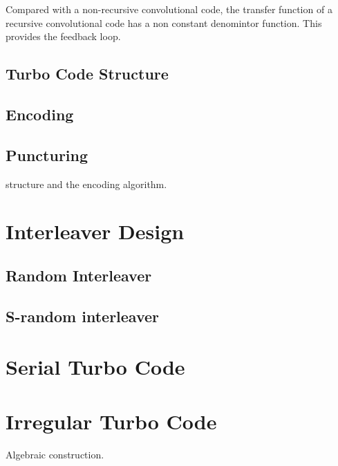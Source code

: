 Compared with a non-recursive convolutional code, the transfer function of a recursive convolutional code has a non constant denomintor function. This provides the feedback loop.

\subsection{Turbo Code Structure}

\subsection{Encoding}

\subsection{Puncturing}

structure and the encoding algorithm. 
\section{Interleaver Design}
\subsection{Random Interleaver} 
\subsection{S-random interleaver}

\section{Serial Turbo Code}


\section{Irregular Turbo Code}

Algebraic construction. 


